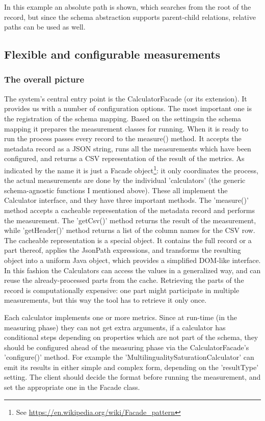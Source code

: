 In this example an absolute path is shown, which searches from the root of the record, but since the schema abstraction supports parent-child relations, relative paths can be used as well.

\subsection{Flexible and configurable measurements}

\subsubsection{The overall picture}

The system's central entry point is the CalculatorFacade (or its extension). It provides us with a number of configuration options. The most important one is the registration of the schema mapping. Based on the settingsin the schema mapping it prepares the measurement classes for running. When it is ready to run the process passes every record to the measure() method. It accepts the metadata record as a JSON string, runs all the measurements which have been configured, and returns a CSV representation of the result of the metrics. As indicated by the name it is just a Facade object\footnote{See \url{https://en.wikipedia.org/wiki/Facade_pattern}}: it only coordinates the process, the actual measurements are done by the individual 'calculators' (the generic schema-agnostic functions I mentioned above). These all implement the Calculator interface, and they have three important methods. The 'measure()' method accepts a cacheable representation of the metadata record and performs the measurement. The 'getCsv()' method returns the result of the measurement, while 'getHeader()' method returns a list of the column names for the CSV row. The cacheable representation is a special object. It contains the full record or a part thereof, applies the JsonPath expressions, and transforms the resulting object into a uniform Java object, which provides a simplified DOM-like interface. In this fashion the Calculators can access the values in a generalized way, and can reuse the already-processed parts from the cache. Retrieving the parts of the record is computationally expensive: one part might participate in multiple measurements, but this way the tool has to retrieve it only once.

Each calculator implements one or more metrics. Since at run-time (in the measuring phase) they can not get extra arguments, if a calculator has conditional steps depending on properties which are not part of the schema, they should be configured ahead of the measuring phase via the CalculatorFacade's 'configure()' method. For example the 'MultilingualitySaturationCalculator' can emit its results in either simple and complex form, depending on the 'resultType' setting. The client should decide the format before running the measurement, and set the appropriate one in the Facade class.

